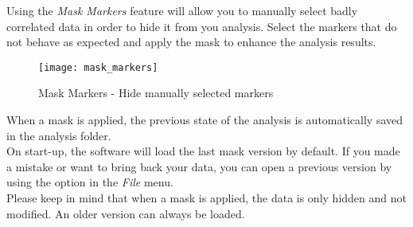 \indent\indent Using the \textit{Mask Markers} feature will allow you to manually select badly correlated data in order to hide it from you analysis. Select the markers that do not behave as expected and apply the mask to enhance the analysis results.\\

\begin{figure}[!h]
   \centering
   \texttt{[image: mask\_markers]}
   \caption{Mask Markers - Hide manually selected markers}
\end{figure}

\newline
\indent When a mask is applied, the previous state of the analysis is automatically saved in the analysis folder.\\
On start-up, the software will load the last mask version by default. If you made a mistake or want to bring back your data, you can open a previous version by using the  option in the \textit{File} menu.\\
\newline
\indent Please keep in mind that when a mask is applied, the data is only hidden and not modified. An older version can always be loaded.
